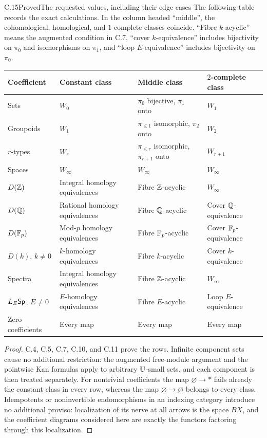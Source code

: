 \begin{claim}{C.15}{Proved}{The requested values, including their edge cases}
The following table records the exact calculations.  In the column headed ``middle'', the cohomological, homological, and $1$-complete classes coincide.  ``Fibre $k$-acyclic'' means the augmented condition in C.7, ``cover $k$-equivalence'' includes bijectivity on $\pi_0$ and isomorphisms on $\pi_1$, and ``loop $E$-equivalence'' includes bijectivity on $\pi_0$.
\begin{center}
\small
\begin{tabular}{>{\raggedright\arraybackslash}p{}>{\raggedright\arraybackslash}p{}>{\raggedright\arraybackslash}p{}>{\raggedright\arraybackslash}p{}}
\hline
Coefficient & Constant class & Middle class & $2$-complete class\\
\hline
Sets & $W_0$ & $\pi_0$ bijective, $\pi_1$ onto & $W_1$\\
Groupoids & $W_1$ & $\pi_{\leq1}$ isomorphic, $\pi_2$ onto & $W_2$\\
$r$-types & $W_r$ & $\pi_{\leq r}$ isomorphic, $\pi_{r+1}$ onto & $W_{r+1}$\\
Spaces & $W_\infty$ & $W_\infty$ & $W_\infty$\\
$D(\mathbb Z)$ & Integral homology equivalences & Fibre $\mathbb Z$-acyclic & $W_\infty$\\
$D(\mathbb Q)$ & Rational homology equivalences & Fibre $\mathbb Q$-acyclic & Cover $\mathbb Q$-equivalence\\
$D(\mathbb F_p)$ & Mod-$p$ homology equivalences & Fibre $\mathbb F_p$-acyclic & Cover $\mathbb F_p$-equivalence\\
$D(k)$, $k\ne0$ & $k$-homology equivalences & Fibre $k$-acyclic & Cover $k$-equivalence\\
Spectra & Integral homology equivalences & Fibre $\mathbb Z$-acyclic & $W_\infty$\\
$L_E\mathsf{Sp}$, $E\ne0$ & $E$-homology equivalences & Fibre $E$-acyclic & Loop $E$-equivalence\\
Zero coefficients & Every map & Every map & Every map\\
\hline
\end{tabular}
\end{center}
\end{claim}
\begin{proof}
C.4, C.5, C.7, C.10, and C.11 prove the rows.  Infinite component sets cause no additional restriction: the augmented free-module argument and the pointwise Kan formulas apply to arbitrary $\mathbb U$-small sets, and each component is then treated separately.  For nontrivial coefficients the map $\varnothing\to *$ fails already the constant class in every row, whereas the map $\varnothing\to\varnothing$ belongs to every class.  Idempotents or noninvertible endomorphisms in an indexing category introduce no additional proviso: localization of its nerve at all arrows is the space $BX$, and the coefficient diagrams considered here are exactly the functors factoring through this localization.
\end{proof}
